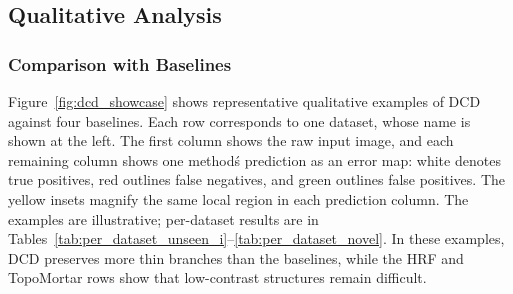 \subsection{Qualitative Analysis}
\label{sec:qualitative}

\subsubsection{Comparison with Baselines}
Figure~\ref{fig:dcd_showcase} shows representative qualitative examples of
DCD against four baselines.  Each row corresponds to one dataset, whose name
is shown at the left.  The first column shows the raw input image, and each
remaining column shows one method\'s prediction as an error map: white denotes
true positives, red outlines false negatives, and green outlines false
positives.  The yellow insets magnify the same
local region in each prediction column.  The examples are illustrative;
per-dataset results are in Tables~\ref{tab:per_dataset_unseen_i}--\ref{tab:per_dataset_novel}.  In these examples, DCD
preserves more thin branches than the baselines, while the HRF and
TopoMortar rows show that low-contrast structures remain difficult.

